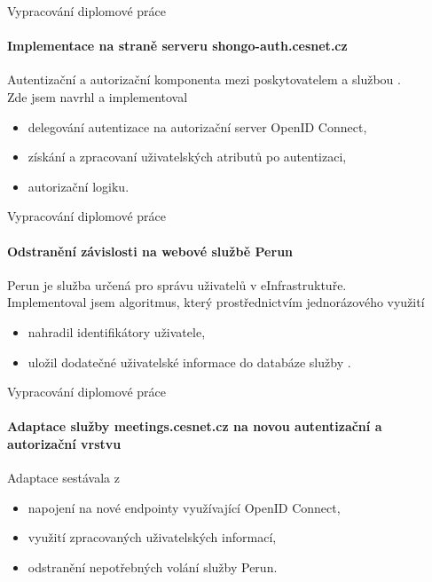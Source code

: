 \documentclass[
]{beamer}
\begin{document}
\begin{frame}{Vypracování diplomové práce}
\framesubtitle{Implementace na straně serveru shongo-auth.cesnet.cz}

Autentizační a autorizační komponenta mezi poskytovatelem  a službou .
\\
\medskip
Zde jsem navrhl a implementoval 
\begin{itemize}
    \item delegování autentizace na autorizační server OpenID Connect,
    \item získání a zpracovaní uživatelských atributů po autentizaci,
    \item autorizační logiku. 
\end{itemize}
\end{frame}

\begin{frame}{Vypracování diplomové práce}
\framesubtitle{Odstranění závislosti na webové službě Perun}
Perun je služba určená pro správu uživatelů v eInfrastruktuře. 
\\
\medskip
Implementoval jsem algoritmus, který prostřednictvím jednorázového využití   
\begin{itemize}
    \item nahradil identifikátory uživatele,
    \item uložil dodatečné uživatelské informace do databáze služby .
\end{itemize}
\end{frame}


\begin{frame}{Vypracování diplomové práce}
\framesubtitle{Adaptace služby meetings.cesnet.cz na novou autentizační a autorizační vrstvu}
Adaptace sestávala z 

\begin{itemize}
    \item napojení na nové endpointy využívající OpenID Connect,
    \item využití zpracovaných uživatelských informací,
    \item odstranění nepotřebných volání služby Perun.
\end{itemize}

\end{frame}
\end{document}
